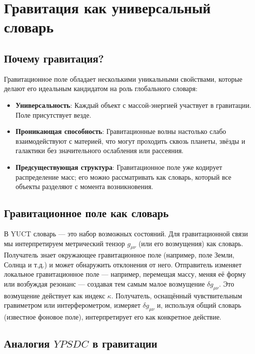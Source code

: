 \documentclass[12pt,a4paper]{article}
\newcommand{\YPSDC}{YPSDC}
\begin{document}
	\section{Гравитация как универсальный словарь}
	\label{sec:gravity}
	
	\subsection{Почему гравитация?}
	
	Гравитационное поле обладает несколькими уникальными свойствами, которые делают его идеальным кандидатом на роль глобального словаря:
	\begin{itemize}
		\item \textbf{Универсальность}: Каждый объект с массой-энергией участвует в гравитации. Поле присутствует везде.
		\item \textbf{Проникающая способность}: Гравитационные волны настолько слабо взаимодействуют с материей, что могут проходить сквозь планеты, звёзды и галактики без значительного ослабления или рассеяния.
		\item \textbf{Предсуществующая структура}: Гравитационное поле уже кодирует распределение масс; его можно рассматривать как словарь, который все объекты разделяют с момента возникновения.
	\end{itemize}
	
	\subsection{Гравитационное поле как словарь}
	
	В YUCT словарь — это набор возможных состояний. Для гравитационной связи мы интерпретируем метрический тензор \(g_{\mu\nu}\) (или его возмущения) как словарь. Получатель знает окружающее гравитационное поле (например, поле Земли, Солнца и т.д.) и может обнаружить отклонения от него. Отправитель изменяет локальное гравитационное поле — например, перемещая массу, меняя её форму или возбуждая резонанс — создавая тем самым малое возмущение \(\delta g_{\mu\nu}\). Это возмущение действует как индекс \(\kappa\). Получатель, оснащённый чувствительным гравиметром или интерферометром, измеряет \(\delta g_{\mu\nu}\) и, используя общий словарь (известное фоновое поле), интерпретирует его как конкретное действие.
	
	\subsection{Аналогия \(\YPSDC\) в гравитации}
	
\end{document}
